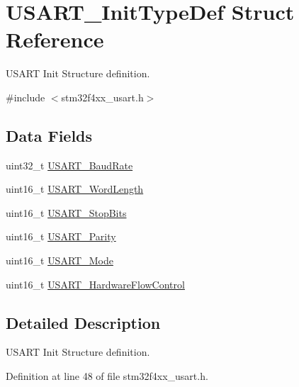 \hypertarget{struct_u_s_a_r_t___init_type_def}{\section{U\-S\-A\-R\-T\-\_\-\-Init\-Type\-Def Struct Reference}
\label{struct_u_s_a_r_t___init_type_def}
}


U\-S\-A\-R\-T Init Structure definition.  




{\ttfamily \#include $<$stm32f4xx\-\_\-usart.\-h$>$}

\subsection*{Data Fields}
\begin{DoxyCompactItemize}
\item 
uint32\-\_\-t \hyperlink{struct_u_s_a_r_t___init_type_def_a8712e31ee9d088d83c84d38d88c6af0b}{U\-S\-A\-R\-T\-\_\-\-Baud\-Rate}
\item 
uint16\-\_\-t \hyperlink{struct_u_s_a_r_t___init_type_def_aa1248b67914e095c0de768223eea9328}{U\-S\-A\-R\-T\-\_\-\-Word\-Length}
\item 
uint16\-\_\-t \hyperlink{struct_u_s_a_r_t___init_type_def_aa58409990a6a0bc99f432eb90e204c0f}{U\-S\-A\-R\-T\-\_\-\-Stop\-Bits}
\item 
uint16\-\_\-t \hyperlink{struct_u_s_a_r_t___init_type_def_a4edcc84644c8553a1a6e841c48ea8413}{U\-S\-A\-R\-T\-\_\-\-Parity}
\item 
uint16\-\_\-t \hyperlink{struct_u_s_a_r_t___init_type_def_a1a581f24451bf5a4a210bab8d68998e2}{U\-S\-A\-R\-T\-\_\-\-Mode}
\item 
uint16\-\_\-t \hyperlink{struct_u_s_a_r_t___init_type_def_ab41fe3b9f5cb4ed89be23bff0a1f4114}{U\-S\-A\-R\-T\-\_\-\-Hardware\-Flow\-Control}
\end{DoxyCompactItemize}


\subsection{Detailed Description}
U\-S\-A\-R\-T Init Structure definition. 

Definition at line 48 of file stm32f4xx\-\_\-usart.\-h.



